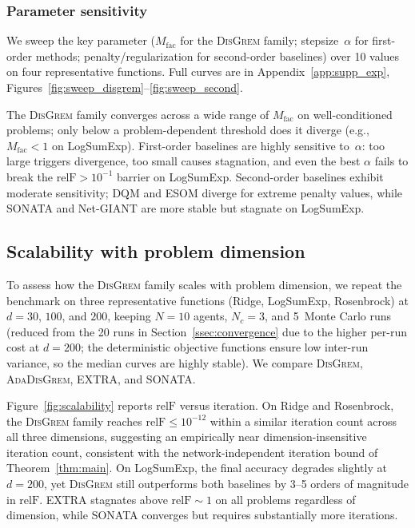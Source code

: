 \documentclass[review,onefignum,onetabnum]{siamart171218}
\begin{document}
	\subsubsection{Parameter sensitivity}

	We sweep the key parameter ($M_{\mathrm{fac}}$ for the
	\textsc{DisGrem} family; stepsize~$\alpha$ for first-order methods;
	penalty/regularization for second-order baselines) over 10 values
	on four representative functions.
	Full curves are in Appendix~\ref{app:supp_exp},
	Figures~\ref{fig:sweep_disgrem}--\ref{fig:sweep_second}.

	The \textsc{DisGrem} family converges across a wide range of
	$M_{\mathrm{fac}}$ on well-conditioned problems; only below a
	problem-dependent threshold does it diverge (e.g., $M_{\mathrm{fac}}{<}1$
	on LogSumExp).
	First-order baselines are highly sensitive to~$\alpha$: too large
	triggers divergence, too small causes stagnation, and even the
	best $\alpha$ fails to break the $\mathrm{relF}>10^{-1}$ barrier on
	LogSumExp.
	Second-order baselines exhibit moderate sensitivity; DQM and ESOM
	diverge for extreme penalty values, while SONATA and Net-GIANT are
	more stable but stagnate on LogSumExp.
	
	\FloatBarrier
	
	\subsection{Scalability with problem dimension}\label{ssec:scalability}

	To assess how the \textsc{DisGrem} family scales with problem
	dimension, we repeat the benchmark on three representative functions
	(Ridge, LogSumExp, Rosenbrock) at $d=30$, $100$, and $200$, keeping
	$N=10$ agents, $N_c=3$, and 5~Monte Carlo runs
	(reduced from the 20 runs in Section~\ref{ssec:convergence}
	due to the higher per-run cost at $d{=}200$;
	the deterministic objective functions ensure low inter-run variance,
	so the median curves are highly stable).
	We compare \textsc{DisGrem}, \textsc{AdaDisGrem}, EXTRA, and SONATA.

	Figure~\ref{fig:scalability} reports $\mathrm{relF}$ versus iteration.
	On Ridge and Rosenbrock, the \textsc{DisGrem} family reaches
	$\mathrm{relF}\le 10^{-12}$ within a similar iteration count across
	all three dimensions, suggesting an empirically near dimension-insensitive
	iteration count, consistent with the network-independent iteration bound
	of Theorem~\ref{thm:main}.
	On LogSumExp, the final accuracy degrades slightly at $d=200$, yet
	\textsc{DisGrem} still outperforms both baselines by 3--5 orders
	of magnitude in $\mathrm{relF}$.
	EXTRA stagnates above $\mathrm{relF}\sim 1$ on all problems
	regardless of dimension, while SONATA converges but requires
	substantially more iterations.
\end{document}
